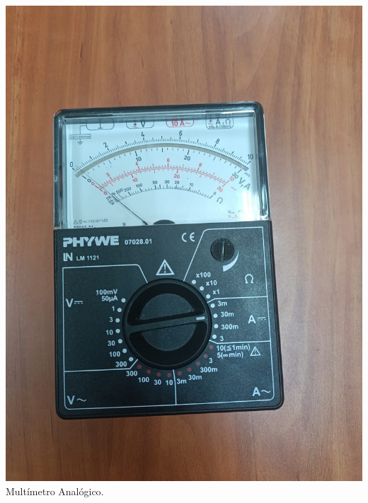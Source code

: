 \documentclass[10pt]{article}
\begin{document}
\begin{multicols}{2}
\begin{center}
	\includegraphics[scale = 0.1]{Imagenes/Material/MultiA.jpeg}\\
	Multímetro Analógico.\\


\end{center}
\end{multicols}
\end{document}
